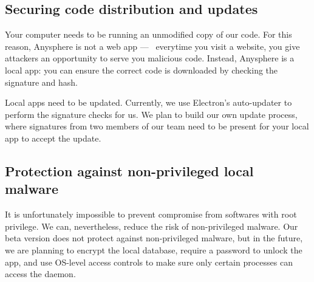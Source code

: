 \subsection{Securing code distribution and updates}

Your computer needs to be running an unmodified copy of our code. For this reason, Anysphere is not a web app —  everytime you visit a website, you give attackers an opportunity to serve you malicious code. Instead, Anysphere is a local app: you can ensure the correct code is downloaded by checking the signature and hash.



Local apps need to be updated. Currently, we use Electron's auto-updater to perform the signature checks for us. We plan to build our own update process, where signatures from two members of our team need to be present for your local app to accept the update. 


\subsection{Protection against non-privileged local malware}

It is unfortunately impossible to prevent compromise from softwares with root privilege. We can, nevertheless, reduce the risk of non-privileged malware. Our beta version does not protect against non-privileged malware, but in the future, we are planning to encrypt the local database, require a password to unlock the app, and use OS-level access controls to make sure only certain processes can access the daemon.

